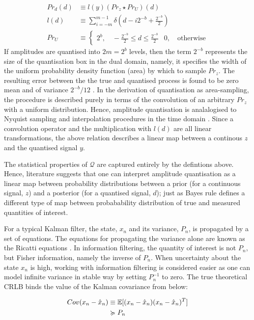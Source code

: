 \begin{align}
Pr_d(d) & \equiv l(y) (Pr_z \star Pr_U)(d) \\
l(d) & \equiv \sum_{i = -m}^{m-1} \delta (d - i2^{-b} +  \frac{2^{-b}}{2} ) \\
Pr_U & \equiv \begin{cases} 2^b, \quad -\frac{2^{-b}}{2} \leq d \leq  \frac{2^{-b}}{2} & 0, \quad \text{otherwise} \end{cases}
\end{align}
If amplitudes are quantised into $2m= 2^b$ levels, then the term $2^{-b}$ represents the size of the quantisation box in the dual domain, namely, it specifies the width of the uniform probability density function (area) by which to sample $Pr_z$.  The resulting error between the the true and quantised process is found to be zero mean and of variance $2^{-b} / 12$ \cite{widrow1996}. In the derivation of quantisation as area-sampling, the procedure is described purely in terms of the convolution of an arbitrary $Pr_z$ with a uniform distribution. Hence, amplitude quantisation is analalogised to Nyquist sampling and interpolation procedures in the time domain \cite{widrow1996}. 
Since a convolution operator and the multiplication with $l(d)$ are all linear transformations, the above relation describes a linear map between a continous $z$ and the quantised signal $y$. 

The statistical properties of $\mathcal{Q}$ are captured entirely by the defintions above. Hence, literature suggests that one can interpret amplitude quantisation as a linear map between probability distributions between a prior (for a continuous signal, $z$) and a posterior (for a quantised signal, $d$); just as Bayes rule defines a different type of map between probabability distribution of true and measured quantities of interest. 

For a typical Kalman filter,  the state, $x_n$ and its variance, $P_n$, is propagated by a set of equations. The equations for propagating the variance alone are known as the Ricatti equations \cite{grewal2001theory}. In information filtering, the quantity of interest is not $P_n$, but Fisher information, namely the inverse of $P_n$. When uncertainty about the state $x_n$ is high, working with information filtering is considered easier as one can model infinite variance in stable way by setting $P_n^{-1}$ to zero. The true theoretical CRLB binds the value of the Kalman covariance from below:

\begin{align}
Cov(x_n- \hat{x}_n) & \equiv \mathbb{E}[(x_n - \hat{x}_n)(x_n- \hat{x}_n)^T] \\
& \succcurlyeq P_n 
\end{align}

